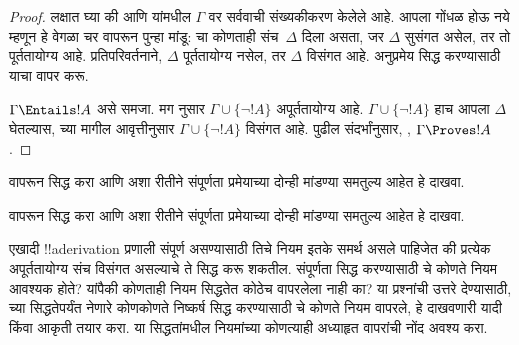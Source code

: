 \documentclass[../../../include/open-logic-section]{subfiles}
\begin{document}
\begin{proof}
लक्षात घ्या की  आणि
 यांमधील $\Gamma$ वर सर्ववाची संख्यकीकरण केलेले
आहे. आपला गोंधळ होऊ नये म्हणून  हे वेगळा चर
वापरून पुन्हा मांडू: चा कोणताही संच~$\Delta$ दिला असता,
जर $\Delta$ सुसंगत असेल, तर तो पूर्ततायोग्य आहे. प्रतिपरिवर्तनाने,
$\Delta$ पूर्ततायोग्य नसेल, तर $\Delta$ विसंगत आहे. अनुप्रमेय सिद्ध
करण्यासाठी याचा वापर करू.

$\Gamma \Entails !A$ असे समजा. मग 
नुसार $\Gamma \cup \{\lnot !A\}$ अपूर्ततायोग्य आहे. $\Gamma \cup
\{\lnot !A\}$ हाच आपला $\Delta$ घेतल्यास,
 च्या मागील आवृत्तीनुसार $\Gamma \cup
\{\lnot !A\}$ विसंगत आहे. पुढील संदर्भांनुसार,
,
$\Gamma \Proves !A$.
\end{proof}

\begin{prob}
 वापरून
 सिद्ध करा आणि अशा रीतीने
संपूर्णता प्रमेयाच्या दोन्ही मांडण्या समतुल्य आहेत हे दाखवा.
\end{prob}
\tagendprob

\begin{prob}
 वापरून
 सिद्ध करा आणि अशा रीतीने
संपूर्णता प्रमेयाच्या दोन्ही मांडण्या समतुल्य आहेत हे दाखवा.
\end{prob}
\tagendprob

\begin{prob}
एखादी !!a{derivation} प्रणाली संपूर्ण असण्यासाठी तिचे नियम इतके समर्थ
असले पाहिजेत की प्रत्येक अपूर्ततायोग्य संच विसंगत असल्याचे ते सिद्ध करू
शकतील. संपूर्णता सिद्ध करण्यासाठी चे कोणते नियम आवश्यक
होते? यांपैकी कोणताही नियम सिद्धतेत कोठेच वापरलेला नाही का? या प्रश्नांची
उत्तरे देण्यासाठी,  च्या सिद्धतेपर्यंत
नेणारे कोणकोणते निष्कर्ष सिद्ध करण्यासाठी चे कोणते नियम वापरले, हे
दाखवणारी यादी किंवा आकृती तयार करा. या सिद्धतांमधील नियमांच्या कोणत्याही
अध्याहृत वापरांची नोंद अवश्य करा.
\end{prob}
\tagendprob
\end{document}
